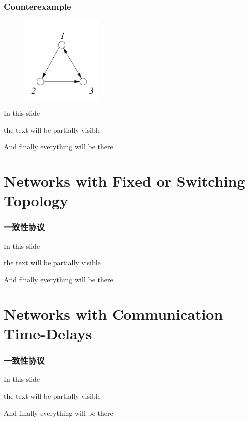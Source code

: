 \documentclass{beamer}
\begin{document}
\begin{frame}
\frametitle{Counterexample}
    \begin{figure}[htbp]
        \centering
        \includegraphics[width=4cm]{figures/Fig2-ConnectedDigraph.jpeg}
        \label{ConnectedDigraph}
    \end{figure}

    In this slide %
    
    the text will be partially visible %
    
    And finally everything will be there

\end{frame}

\section{Networks with Fixed or Switching Topology}

\begin{frame}
\frametitle{一致性协议}

    In this slide %
    
    the text will be partially visible %
    
    And finally everything will be there

\end{frame}

\section{Networks with Communication Time-Delays}

\begin{frame}
\frametitle{一致性协议}

    In this slide %
    
    the text will be partially visible %
    
    And finally everything will be there

\end{frame}
\end{document}
